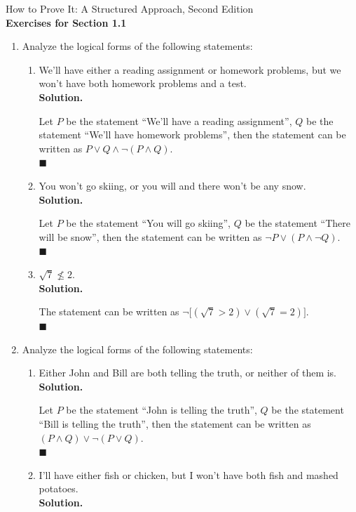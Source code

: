 \documentclass{report}
\newcommand{\sol}{\vspace{1em}\\\textbf{Solution.}\vspace{0.5em}}
\newcommand{\qed}{‎\\‎\hfill$\blacksquare$\vspace{1em}}
\begin{document}
\begin{center}
    \Large{How to Prove It: A Structured Approach, Second Edition}\\
    \vspace{1em}
    \Large{\textbf{Exercises for Section 1.1}}\vspace{1em}
\end{center}
\begin{enumerate}[leftmargin=*]
    \item  Analyze the logical forms of the following statements:
          \begin{enumerate}
              \item We'll have either a reading assignment or homework problems, but we won't have
                    both homework problems and a test. \sol{}

                    Let $P$ be the statement ``We'll have a reading assignment'', $Q$ be the
                    statement ``We'll have homework problems'', then the statement can be written
                    as $P \vee Q \wedge \neg(P \wedge Q)$. \qed

              \item You won't go skiing, or you will and there won't be any snow. \sol{}

                    Let $P$ be the statement ``You will go skiing'', $Q$ be the statement ``There
                    will be snow'', then the statement can be written as $\neg P \vee (P \wedge
                        \neg Q)$. \qed

              \item $\sqrt{7} \nleq 2$.
                    \sol{}

                    The statement can be written as $\neg\big[(\sqrt{7} > 2) \vee (\sqrt{7} =
                            2)\big]$. \qed
          \end{enumerate}
    \item Analyze the logical forms of the following statements:
          \begin{enumerate}
              \item  Either John and Bill are both telling the truth, or neither of them is. \sol{}

                    Let $P$ be the statement ``John is telling the truth'', $Q$ be the statement
                    ``Bill is telling the truth'', then the statement can be written as $(P \wedge
                        Q) \vee \neg(P \vee Q)$. \qed

              \item I'll have either fish or chicken, but I won't have both fish and mashed
                    potatoes. \sol{}


\end{enumerate}
\end{enumerate}
\end{document}
